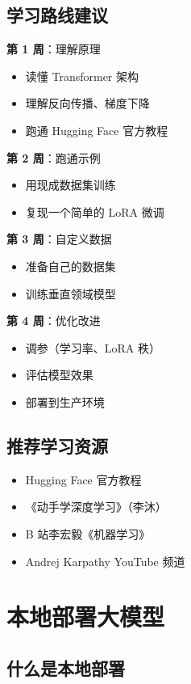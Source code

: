 \documentclass[12pt,UTF8]{ctexbook}
\begin{document}
\section{学习路线建议}

\textbf{第 1 周}：理解原理
\begin{itemize}
  \item 读懂 Transformer 架构
  \item 理解反向传播、梯度下降
  \item 跑通 Hugging Face 官方教程
\end{itemize}

\textbf{第 2 周}：跑通示例
\begin{itemize}
  \item 用现成数据集训练
  \item 复现一个简单的 LoRA 微调
\end{itemize}

\textbf{第 3 周}：自定义数据
\begin{itemize}
  \item 准备自己的数据集
  \item 训练垂直领域模型
\end{itemize}

\textbf{第 4 周}：优化改进
\begin{itemize}
  \item 调参（学习率、LoRA 秩）
  \item 评估模型效果
  \item 部署到生产环境
\end{itemize}

\section{推荐学习资源}

\begin{itemize}
  \item Hugging Face 官方教程
  \item 《动手学深度学习》（李沐）
  \item B 站李宏毅《机器学习》
  \item Andrej Karpathy YouTube 频道
\end{itemize}

\chapter{本地部署大模型}

\section{什么是本地部署}
\end{document}
